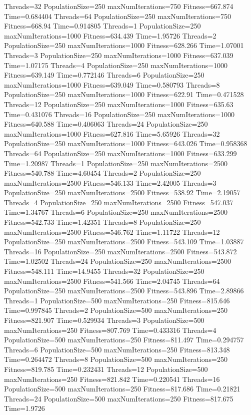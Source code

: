 \documentclass[10pt,letterpaper]{article}
\begin{document}
Threads=32 PopulationSize=250 maxNumIterations=750 Fitness=667.874 Time=0.684404
Threads=64 PopulationSize=250 maxNumIterations=750 Fitness=668.94 Time=0.914805
Threads=1 PopulationSize=250 maxNumIterations=1000 Fitness=634.439 Time=1.95726
Threads=2 PopulationSize=250 maxNumIterations=1000 Fitness=628.266 Time=1.07001
Threads=3 PopulationSize=250 maxNumIterations=1000 Fitness=637.039 Time=1.07175
Threads=4 PopulationSize=250 maxNumIterations=1000 Fitness=639.149 Time=0.772146
Threads=6 PopulationSize=250 maxNumIterations=1000 Fitness=639.049 Time=0.580793
Threads=8 PopulationSize=250 maxNumIterations=1000 Fitness=622.91 Time=0.471528
Threads=12 PopulationSize=250 maxNumIterations=1000 Fitness=635.63 Time=0.431076
Threads=16 PopulationSize=250 maxNumIterations=1000 Fitness=640.588 Time=0.406063
Threads=24 PopulationSize=250 maxNumIterations=1000 Fitness=627.816 Time=5.65926
Threads=32 PopulationSize=250 maxNumIterations=1000 Fitness=643.026 Time=0.958368
Threads=64 PopulationSize=250 maxNumIterations=1000 Fitness=633.299 Time=1.20987
Threads=1 PopulationSize=250 maxNumIterations=2500 Fitness=540.788 Time=4.60454
Threads=2 PopulationSize=250 maxNumIterations=2500 Fitness=546.133 Time=2.42005
Threads=3 PopulationSize=250 maxNumIterations=2500 Fitness=538.92 Time=2.19057
Threads=4 PopulationSize=250 maxNumIterations=2500 Fitness=547.037 Time=1.34767
Threads=6 PopulationSize=250 maxNumIterations=2500 Fitness=542.733 Time=1.42351
Threads=8 PopulationSize=250 maxNumIterations=2500 Fitness=546.762 Time=1.11722
Threads=12 PopulationSize=250 maxNumIterations=2500 Fitness=543.109 Time=1.03887
Threads=16 PopulationSize=250 maxNumIterations=2500 Fitness=543.872 Time=1.02502
Threads=24 PopulationSize=250 maxNumIterations=2500 Fitness=548.111 Time=14.9455
Threads=32 PopulationSize=250 maxNumIterations=2500 Fitness=541.566 Time=2.04745
Threads=64 PopulationSize=250 maxNumIterations=2500 Fitness=543.896 Time=2.89866
Threads=1 PopulationSize=500 maxNumIterations=250 Fitness=815.646 Time=0.997845
Threads=2 PopulationSize=500 maxNumIterations=250 Fitness=821.907 Time=0.529934
Threads=3 PopulationSize=500 maxNumIterations=250 Fitness=807.769 Time=0.433316
Threads=4 PopulationSize=500 maxNumIterations=250 Fitness=811.497 Time=0.294757
Threads=6 PopulationSize=500 maxNumIterations=250 Fitness=813.348 Time=0.264472
Threads=8 PopulationSize=500 maxNumIterations=250 Fitness=819.785 Time=0.232431
Threads=12 PopulationSize=500 maxNumIterations=250 Fitness=821.842 Time=0.220541
Threads=16 PopulationSize=500 maxNumIterations=250 Fitness=817.686 Time=0.21821
Threads=24 PopulationSize=500 maxNumIterations=250 Fitness=817.675 Time=1.9726
\end{document}
